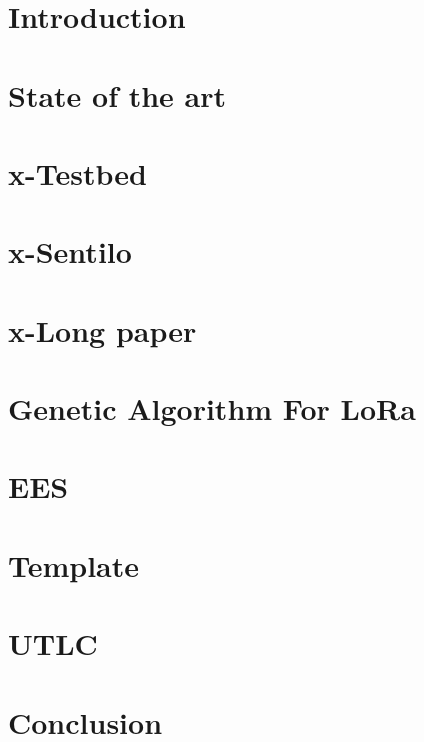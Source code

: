 




\begin{refsection}
\preface
\body


\chapter[01]{Introduction}
\chapter[02]{State of the art}
\chapter[03]{x-Testbed}
\chapter[04]{x-Sentilo}
\chapter[05]{x-Long paper}
\chapter[06]{Genetic Algorithm For LoRa}%
\chapter[21]{EES}%
\chapter[07]{Template}
\chapter[08]{UTLC}
\chapter[09]{Conclusion}


\end{refsection}
